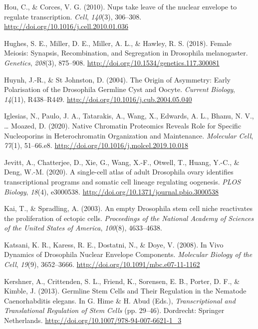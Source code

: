 \documentclass[12pt,oneside]{reedthesis}
\begin{document}
\leavevmode\hypertarget{ref-houNupsTakeLeave2010}{}%
Hou, C., \& Corces, V. G. (2010). Nups take leave of the nuclear envelope to regulate transcription. \emph{Cell}, \emph{140}(3), 306--308. \url{http://doi.org/10.1016/j.cell.2010.01.036}

\leavevmode\hypertarget{ref-hughesFemaleMeiosisSynapsis2018}{}%
Hughes, S. E., Miller, D. E., Miller, A. L., \& Hawley, R. S. (2018). Female Meiosis: Synapsis, Recombination, and Segregation in Drosophila melanogaster. \emph{Genetics}, \emph{208}(3), 875--908. \url{http://doi.org/10.1534/genetics.117.300081}

\leavevmode\hypertarget{ref-huynhOriginAsymmetryEarly2004}{}%
Huynh, J.-R., \& St Johnston, D. (2004). The Origin of Asymmetry: Early Polarisation of the Drosophila Germline Cyst and Oocyte. \emph{Current Biology}, \emph{14}(11), R438--R449. \url{http://doi.org/10.1016/j.cub.2004.05.040}

\leavevmode\hypertarget{ref-iglesiasNativeChromatinProteomics2020}{}%
Iglesias, N., Paulo, J. A., Tatarakis, A., Wang, X., Edwards, A. L., Bhanu, N. V., \ldots{} Moazed, D. (2020). Native Chromatin Proteomics Reveals Role for Specific Nucleoporins in Heterochromatin Organization and Maintenance. \emph{Molecular Cell}, \emph{77}(1), 51--66.e8. \url{http://doi.org/10.1016/j.molcel.2019.10.018}

\leavevmode\hypertarget{ref-jevittSinglecellAtlasAdult2020}{}%
Jevitt, A., Chatterjee, D., Xie, G., Wang, X.-F., Otwell, T., Huang, Y.-C., \& Deng, W.-M. (2020). A single-cell atlas of adult Drosophila ovary identifies transcriptional programs and somatic cell lineage regulating oogenesis. \emph{PLOS Biology}, \emph{18}(4), e3000538. \url{http://doi.org/10.1371/journal.pbio.3000538}

\leavevmode\hypertarget{ref-kaiEmptyDrosophilaStem2003}{}%
Kai, T., \& Spradling, A. (2003). An empty Drosophila stem cell niche reactivates the proliferation of ectopic cells. \emph{Proceedings of the National Academy of Sciences of the United States of America}, \emph{100}(8), 4633--4638.

\leavevmode\hypertarget{ref-katsaniVivoDynamicsDrosophila2008a}{}%
Katsani, K. R., Karess, R. E., Dostatni, N., \& Doye, V. (2008). In Vivo Dynamics of Drosophila Nuclear Envelope Components. \emph{Molecular Biology of the Cell}, \emph{19}(9), 3652--3666. \url{http://doi.org/10.1091/mbc.e07-11-1162}

\leavevmode\hypertarget{ref-kershnerGermlineStemCells2013}{}%
Kershner, A., Crittenden, S. L., Friend, K., Sorensen, E. B., Porter, D. F., \& Kimble, J. (2013). Germline Stem Cells and Their Regulation in the Nematode Caenorhabditis elegans. In G. Hime \& H. Abud (Eds.), \emph{Transcriptional and Translational Regulation of Stem Cells} (pp. 29--46). Dordrecht: Springer Netherlands. \url{http://doi.org/10.1007/978-94-007-6621-1_3}
\end{document}

